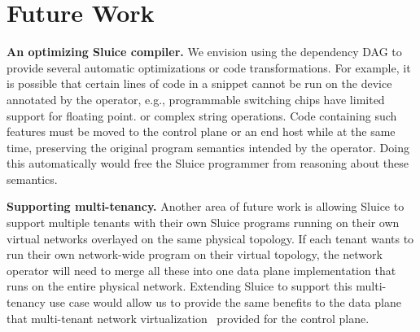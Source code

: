 \section{Future Work}
\textbf{An optimizing Sluice compiler.} We envision using the dependency DAG to
provide several automatic optimizations or code transformations. For example,
it is possible that certain lines of code in a snippet cannot be run on the
device annotated by the operator, e.g., programmable switching chips have
limited support for floating point. or complex string operations. Code
containing such features must be moved to the control plane or an end host while at the same time, preserving the original program semantics intended by the operator. Doing this automatically would free the Sluice programmer from reasoning about these semantics.

\textbf{Supporting multi-tenancy.} Another area of future work is allowing
Sluice to support multiple tenants with their own Sluice
programs running on their own virtual networks overlayed on the same physical
topology. If each tenant wants to run their own network-wide program on their
virtual topology, the network operator will need to merge all these into one
data plane implementation that runs on the entire physical network. Extending
Sluice to support this multi-tenancy use case would allow us to provide the
same benefits to the data plane that multi-tenant network
virtualization~\cite{multitenant} provided for the control plane.\\\\\\




